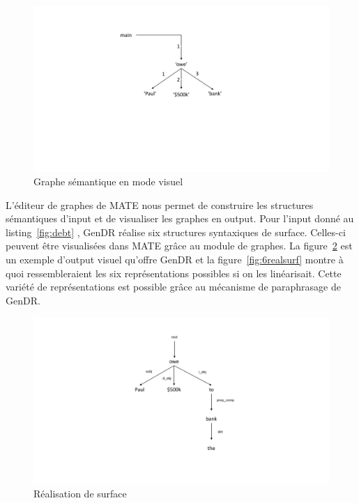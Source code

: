 \begin{figure}[htb]
	\centering
	\includegraphics[width=1\textwidth, trim = {0cm 7cm 0cm 3cm},clip]{ch3/figs/owe_sem.pdf}
	\caption{Graphe sémantique en mode visuel}
	\label{fig:graphesem}
\end{figure}

L'éditeur de graphes de MATE nous permet de construire les structures sémantiques d'input et de visualiser les graphes en output. Pour l'input donné au listing~\ref{fig:debt} , GenDR réalise six structures syntaxiques de surface. Celles-ci peuvent être visualisées dans MATE grâce au module de graphes. La figure~\ref{fig:realsurfex} est un exemple d'output visuel qu'offre GenDR et la figure~\ref{fig:6realsurf} montre à quoi ressembleraient les six représentations possibles si on les linéarisait. Cette variété de représentations est possible grâce au mécanisme de paraphrasage de GenDR.

\begin{figure}[htb]
	\centering
	\includegraphics[width=1\textwidth, trim = {0cm 3cm 0cm 2cm},clip]{ch3/figs/realsurfex.pdf}
	\caption{Réalisation de surface}
	\label{fig:realsurfex}
\end{figure} 

